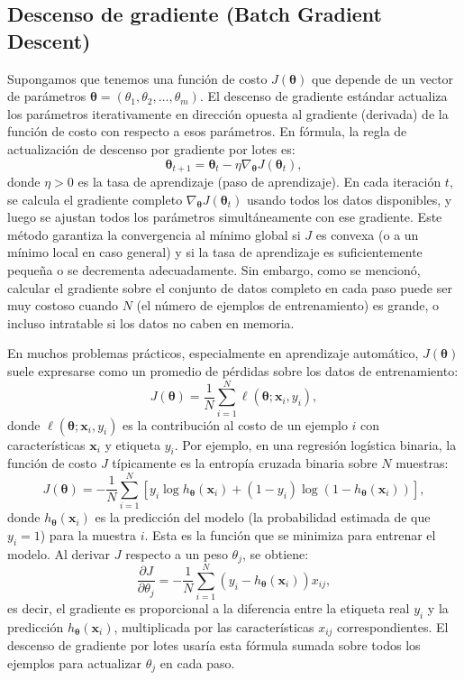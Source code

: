 \documentclass[12pt, spanish]{article}
\begin{document}
\subsection{Descenso de gradiente (Batch Gradient Descent)}
Supongamos que tenemos una función de costo $J(\boldsymbol{\theta})$ que depende de un vector de parámetros $\boldsymbol{\theta} = (\theta_1, \theta_2, \ldots, \theta_m)$. El descenso de gradiente estándar actualiza los parámetros iterativamente en dirección opuesta al gradiente (derivada) de la función de costo con respecto a esos parámetros. En fórmula, la regla de actualización de descenso por gradiente por lotes es:
\[
\boldsymbol{\theta}_{t+1} = \boldsymbol{\theta}_t - \eta \nabla_{\boldsymbol{\theta}} J(\boldsymbol{\theta}_t),
\]
donde $\eta > 0$ es la tasa de aprendizaje (paso de aprendizaje). En cada iteración $t$, se calcula el gradiente completo $\nabla_{\boldsymbol{\theta}} J(\boldsymbol{\theta}_t)$ usando todos los datos disponibles, y luego se ajustan todos los parámetros simultáneamente con ese gradiente. Este método garantiza la convergencia al mínimo global si $J$ es convexa (o a un mínimo local en caso general) y si la tasa de aprendizaje es suficientemente pequeña o se decrementa adecuadamente. Sin embargo, como se mencionó, calcular el gradiente sobre el conjunto de datos completo en cada paso puede ser muy costoso cuando $N$ (el número de ejemplos de entrenamiento) es grande, o incluso intratable si los datos no caben en memoria.

En muchos problemas prácticos, especialmente en aprendizaje automático, $J(\boldsymbol{\theta})$ suele expresarse como un promedio de pérdidas sobre los datos de entrenamiento:
\[
J(\boldsymbol{\theta}) = \frac{1}{N} \sum_{i=1}^N \ell(\boldsymbol{\theta}; \mathbf{x}_i, y_i),
\]
donde $\ell(\boldsymbol{\theta}; \mathbf{x}_i, y_i)$ es la contribución al costo de un ejemplo $i$ con características $\mathbf{x}_i$ y etiqueta $y_i$. Por ejemplo, en una regresión logística binaria, la función de costo $J$ típicamente es la entropía cruzada binaria sobre $N$ muestras:
\[
J(\boldsymbol{\theta}) = -\frac{1}{N} \sum_{i=1}^N \left[ y_i \log h_{\boldsymbol{\theta}}(\mathbf{x}_i) + (1 - y_i) \log(1 - h_{\boldsymbol{\theta}}(\mathbf{x}_i)) \right],
\]
donde $h_{\boldsymbol{\theta}}(\mathbf{x}_i)$ es la predicción del modelo (la probabilidad estimada de que $y_i=1$) para la muestra $i$. Esta es la función que se minimiza para entrenar el modelo. Al derivar $J$ respecto a un peso $\theta_j$, se obtiene:
\[
\frac{\partial J}{\partial \theta_j} = -\frac{1}{N} \sum_{i=1}^N (y_i - h_{\boldsymbol{\theta}}(\mathbf{x}_i)) x_{ij},
\]
es decir, el gradiente es proporcional a la diferencia entre la etiqueta real $y_i$ y la predicción $h_{\boldsymbol{\theta}}(\mathbf{x}_i)$, multiplicada por las características $x_{ij}$ correspondientes. El descenso de gradiente por lotes usaría esta fórmula sumada sobre todos los ejemplos para actualizar $\theta_j$ en cada paso.
\end{document}
